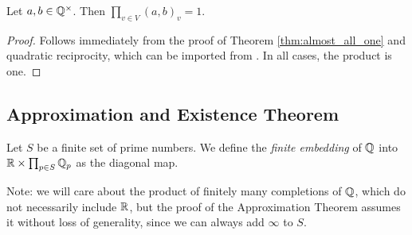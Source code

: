 \begin{theorem}
	\label{thm:product_formula}
	\leanok
Let $a, b \in \mathbb{Q}^\times$. Then $\prod_{v \in V} (a, b)_v = 1$.
\end{theorem}
\begin{proof}
	Follows immediately from the proof of Theorem \ref{thm:almost_all_one} and quadratic reciprocity,
	which can be imported from .
	In all cases, the product is one.
\end{proof}

\subsection{Approximation and Existence Theorem}

\begin{definition}
	\label{def:finite_embedding}
	\leanok
Let $S$ be a finite set of prime numbers.
We define the \emph{finite embedding} of $\mathbb{Q}$ into $\mathbb{R} \times \prod_{p \in S} \mathbb{Q}_p$ as the diagonal map.

\end{definition}

Note: we will care about the product of finitely many completions of $\mathbb{Q}$, which do not necessarily
include $\mathbb{R}$, but the proof of the Approximation Theorem assumes it without loss of generality,
since we can always add $\infty$ to $S$.

